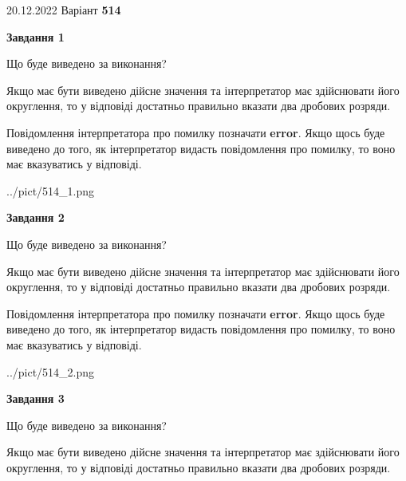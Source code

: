 \documentclass[12pt, ukrainian]{article}
\begin{document}
{20.12.2022 Варіант \No \textbf { 514 }\par}
{
\begin {Large}

{\begin {center}\textbf{Завдання 1}\end {center}}\par
Що буде виведено за виконання? \par

Якщо має бути виведено дійсне значення та інтерпретатор має здійснювати його округлення, 
то у відповіді достатньо правильно вказати два дробових розряди.

Повідомлення інтерпретатора про помилку позначати \textbf{error}.
Якщо щось буде виведено до того, як інтерпретатор видасть повідомлення про помилку, 
то воно має вказуватись у відповіді. \par

\begin{center}
	{../pict/514_1.png}
\end{center}
\newpage

{\begin {center}\textbf{Завдання 2}\end {center}}\par
Що буде виведено за виконання? \par

Якщо має бути виведено дійсне значення та інтерпретатор має здійснювати його округлення, 
то у відповіді достатньо правильно вказати два дробових розряди.

Повідомлення інтерпретатора про помилку позначати \textbf{error}.
Якщо щось буде виведено до того, як інтерпретатор видасть повідомлення про помилку, 
то воно має вказуватись у відповіді. \par

\begin{center}
	{../pict/514_2.png}
\end{center}
\newpage

{\begin {center}\textbf{Завдання 3}\end {center}}\par
Що буде виведено за виконання? \par

Якщо має бути виведено дійсне значення та інтерпретатор має здійснювати його округлення, 
то у відповіді достатньо правильно вказати два дробових розряди.


\end{Large}}
\end{document}
